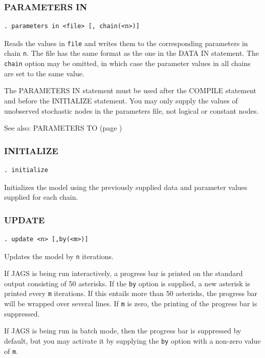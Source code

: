 \documentclass[11pt, a4paper, titlepage]{report}
\begin{document}
\subsubsection{PARAMETERS IN}
\label{parameters:in}

\begin{verbatim}
. parameters in <file> [, chain(<n>)]
\end{verbatim}
Reads the values in \texttt{file} and writes them to the corresponding
parameters in chain \texttt{n}. The file has the same format as the
one in the DATA IN statement.  The \texttt{chain} option may be
omitted, in which case the parameter values in all chains are set to
the same value.

The PARAMETERS IN statement must be used after the COMPILE statement
and before the INITIALIZE statement.  You may only supply the values of
unobserved stochastic nodes in the parameters file, not logical or
constant nodes.

See also: PARAMETERS TO (page \pageref{parameters:to})

\subsubsection{INITIALIZE}

\begin{verbatim}
. initialize
\end{verbatim}
Initializes the model using the previously supplied data and parameter
values supplied for each chain.

\subsubsection{UPDATE}

\begin{verbatim}
. update <n> [,by(<m>)]
\end{verbatim}
Updates the model by \texttt{n} iterations. 

If JAGS is being run interactively, a progress bar is printed on the
standard output consisting of 50 asterisks. If the \texttt{by} option
is supplied, a new asterisk is printed every \texttt{m} iterations. If
this entails more than 50 asterisks, the progress bar will be wrapped
over several lines.  If \texttt{m} is zero, the printing of the
progress bar is suppressed.

If JAGS is being run in batch mode, then the progress bar is
suppressed by default, but you may activate it by supplying the
\texttt{by} option with a non-zero value of \texttt{m}.
\end{document}
